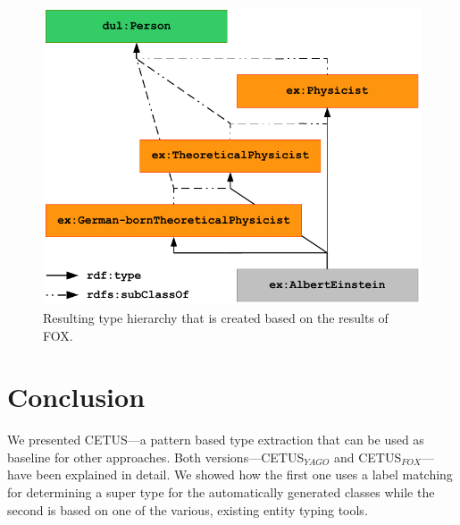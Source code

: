 \begin{figure}[tb!]
\centering
\includegraphics[scale=0.8]{part_02/unstructured_annotation/fig/localFOXHierarchy.pdf}
\caption{Resulting type hierarchy that is created based on the results of FOX.}
\label{fig:localFOXHierarchy}
\end{figure}

\section{Conclusion}
\label{cha321:sec:conclusion}

We presented CETUS---a pattern based type extraction that can be used as baseline for other approaches.
Both versions---CETUS$_{YAGO}$ and CETUS$_{FOX}$---have been explained in detail.
We showed how the first one uses a label matching for determining a super type for the automatically generated classes while the second is based on one of the various, existing entity typing tools.

